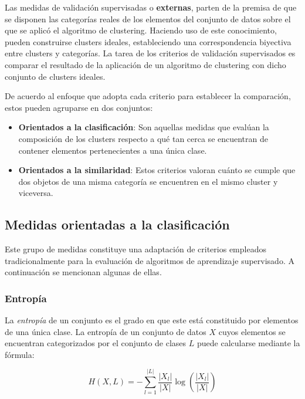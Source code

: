 Las medidas de validación supervisadas o \textbf{externas}, parten de la premisa de que se disponen las categorías reales de los elementos del conjunto de datos sobre el que se aplicó el algoritmo de clustering.
Haciendo uso de este conocimiento, pueden construirse clusters ideales, estableciendo una correspondencia biyectiva entre clusters y categorías.
La tarea de los criterios de validación supervisados es comparar el resultado de la aplicación de un algoritmo de clustering con dicho conjunto de clusters ideales.

De acuerdo al enfoque que adopta cada criterio para establecer la comparación, estos pueden agruparse en dos conjuntos:

\begin{itemize}
    \item \textbf{Orientados a la clasificación}: Son aquellas medidas que evalúan la composición de los clusters respecto a qué tan cerca se encuentran de contener elementos pertenecientes a una única clase.
    \item \textbf{Orientados a la similaridad}: Estos criterios valoran cuánto se cumple que dos objetos de una misma categoría se encuentren en el mismo cluster y viceversa.
\end{itemize}

\subsection{Medidas orientadas a la clasificación}\label{subsec:medidasOrientadasALaClasificación}

Este grupo de medidas constituye una adaptación de criterios empleados tradicionalmente para la evaluación de algoritmos de aprendizaje supervisado.
A continuación se mencionan algunas de ellas.

\subsubsection{Entropía}

La \textit{entropía} de un conjunto es el grado en que este está constituido por elementos de una única clase.
La entropía de un conjunto de datos $X$ cuyos elementos se encuentran categorizados por el conjunto de clases $L$ puede calcularse mediante la fórmula:

\begin{equation}
    \label{eq:entropy}
    H(X, L) = -\sum_{l=1}^{|L|}{\frac{|X_l|}{|X|}\log{\left( \frac{|X_l|}{|X|} \right)}}
\end{equation}

